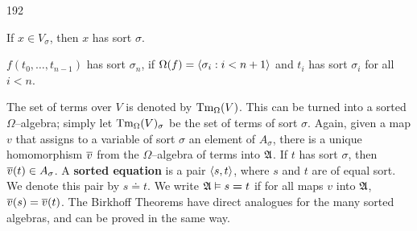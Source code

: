 \begin{dingautolist}{192}
\item If $x \in V_{\sigma}$, then $x$ has sort $\sigma$.
\item $f(t_0, \dotsc, t_{n-1})$ has sort $\sigma_n$, if
$\Omega(f) = \langle \sigma_i : i < n+1\rangle$ and $t_i$ has sort 
$\sigma_i$ for all $i < n$.
\end{dingautolist}
The set of terms over $V$ is denoted by $\operatorname{Tm}_{\Omega}(V)$. This can 
be turned into a sorted $\Omega$--algebra; simply let 
$\operatorname{Tm}_{\Omega}(V)_{\sigma}$
be the set of terms of sort $\sigma$. Again, given a map $v$ that
assigns to a variable of sort $\sigma$ an element of $A_{\sigma}$,
there is a unique homomorphism $\overline{v}$ from the
$\Omega$--algebra of terms into $\mathfrak{A}$. If $t$ has sort $\sigma$,
then $\overline{v}(t) \in A_{\sigma}$. A 
\textbf{sorted equation} is a pair
$\langle s, t\rangle$, where $s$ and $t$ are of equal sort. We denote
this pair by $s \boldsymbol{\doteq} t$. We write $\mathfrak{A} \vDash s 
\boldsymbol{=} t$ if for all maps $v$ into $\mathfrak{A}$, 
$\overline{v}(s) = \overline{v}(t)$. The Birkhoff Theorems have direct 
analogues for the many sorted algebras, and can be proved in the 
same way.

